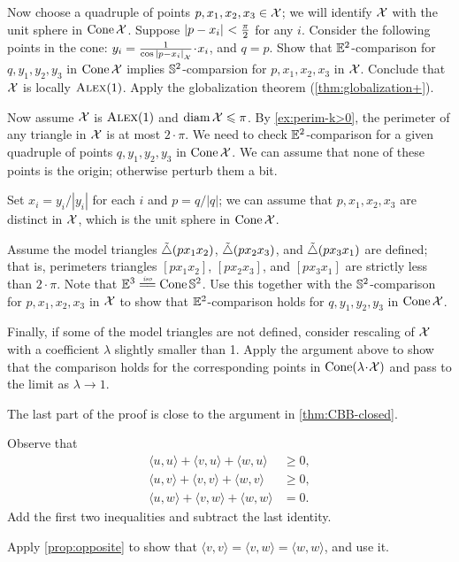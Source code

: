Now choose a quadruple of points $p,x_1,x_2,x_3\in \mathcal{X}$;
we will identify $\mathcal{X}$ with the unit sphere in $\mathop{\rm Cone}\nolimits\mathcal{X}$.
Suppose $|{p}-{x_i}|_{}^{{}}<\tfrac\pi2$ for any $i$.
Consider the following points in the cone: $y_i=\tfrac1{\cos \dist{p}{x_i}{\spc{X}}}\cdot x_i$, and $q=p$.
Show that $\mathbb{E}^2$-comparison for $q,y_1,y_2,y_3$ in $\mathop{\rm Cone}\nolimits\mathcal{X}$ implies $\mathbb{S}^2$-comparsion for $p,x_1,x_2,x_3$ in $\mathcal{X}$.
Conclude that $\mathcal{X}$ is locally $\textsc{Alex}(1)$. 
Apply the globalization theorem (\ref{thm:globalization+}).

Now assume $\mathcal{X}$ is $\textsc{Alex}(1)$ and $\operatorname{\rm diam}\nolimits\mathcal{X}\leqslant \pi$.
By \ref{ex:perim-k>0}, the perimeter of any triangle in $\mathcal{X}$ is at most $2\cdot\pi$.
We need to check $\mathbb{E}^2$-comparison for a given quadruple of points $q,y_1,y_2,y_3$ in $\mathop{\rm Cone}\nolimits\mathcal{X}$.
We can assume that none of these points is the origin; otherwise perturb them a bit.

Set $x_i=y_i/|y_i|$ for each $i$ and $p=q/|q|$; we can assume that $p,x_1,x_2,x_3$ are distinct in $\mathcal{X}$, which is the unit sphere in $\mathop{\rm Cone}\nolimits\mathcal{X}$.

Assume the model triangles $\tilde\triangle(px_1x_2)$, $\tilde\triangle(px_2x_3)$, and $\tilde\triangle(px_3x_1)$ are defined;
that is, perimeters triangles $[px_1x_2]$, $[px_2x_3]$, and $[px_3x_1]$ are strictly less than $2\cdot\pi$. 
Note that $\EE^3\iso\Cone\SSS^2$.
Use this together with the $\mathbb{S}^2$-comparison for $p,x_1,x_2,x_3$ in $\mathcal{X}$ to show that $\mathbb{E}^2$-comparison holds for $q,y_1,y_2,y_3$ in $\mathop{\rm Cone}\nolimits\mathcal{X}$.

Finally, if some of the model triangles are not defined, consider rescaling of $\mathcal{X}$ with a coefficient $\lambda$ slightly smaller than 1.
Apply the argument above to show that the comparison holds for the corresponding points in $\Cone(\lambda\cdot\spc{X})$ and pass to the limit as $\lambda\to 1$.

The last part of the proof is close to the argument in \ref{thm:CBB-closed}.

Observe that
\begin{align*}
\langle u,u\rangle+\langle v,u\rangle+\langle w,u\rangle &\ge 0,
\\
\langle u,v\rangle+\langle v,v\rangle+\langle w,v\rangle &\ge 0,
\\
\langle u,w\rangle+\langle v,w\rangle+\langle w,w\rangle &= 0.
\end{align*}
Add the first two inequalities and subtract the last identity.

Apply \ref{prop:opposite} to show that 
$\langle v,v\rangle =\langle v,w\rangle=\langle w,w\rangle$,
and use it.

